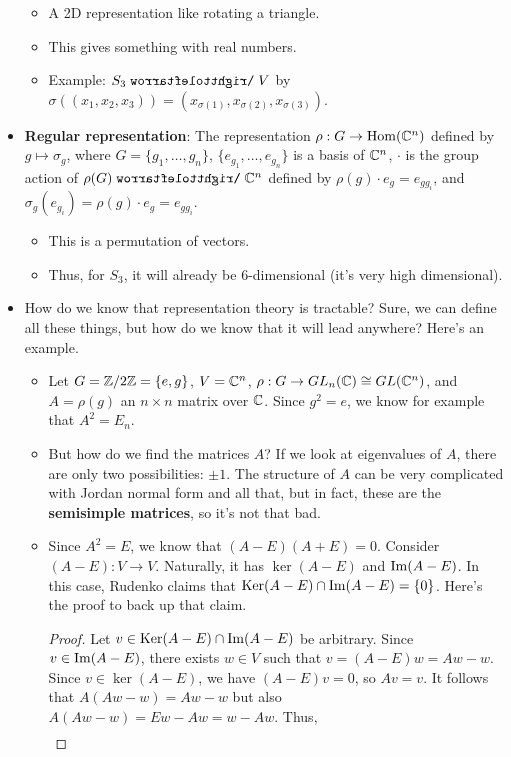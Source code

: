 \documentclass[../notes.tex]{subfiles}
\begin{document}
\begin{itemize}
\begin{itemize}
        \item A 2D representation like rotating a triangle.
        \item This gives something with real numbers.
        \item Example: $S_3\acts V$ by $\sigma((x_1,x_2,x_3))=(x_{\sigma(1)},x_{\sigma(2)},x_{\sigma(3)})$.
    \end{itemize}
    \item \textbf{Regular representation}: The representation $\rho:G\to\operatorname{Hom}(\mathbb{C}^n)$ defined by $g\mapsto\sigma_g$, where $G=\{g_1,\dots,g_n\}$, $\{e_{g_1},\dots,e_{g_n}\}$ is a basis of $\mathbb{C}^n$, $\cdot$ is the group action of $\rho(G)\acts\C^n$ defined by $\rho(g)\cdot e_g=e_{gg_i}$, and $\sigma_g(e_{g_i})=\rho(g)\cdot e_g=e_{gg_i}$.
    \begin{itemize}
        \item This is a permutation of vectors.
        \item Thus, for $S_3$, it will already be 6-dimensional (it's very high dimensional).
    \end{itemize}
    \item How do we know that representation theory is tractable? Sure, we can define all these things, but how do we know that it will lead anywhere? Here's an example.
    \begin{itemize}
        \item Let $G=\mathbb{Z}/2\mathbb{Z}=\{e,g\}$, $V=\mathbb{C}^n$, $\rho:G\to GL_n(\mathbb{C})\cong GL(\mathbb{C}^n)$, and $A=\rho(g)$ an $n\times n$ matrix over $\mathbb{C}$. Since $g^2=e$, we know for example that $A^2=E_n$.
        \item But how do we find the matrices $A$?
        If we look at eigenvalues of $A$, there are only two possibilities: $\pm 1$. The structure of $A$ can be very complicated with Jordan normal form and all that, but in fact, these are the \textbf{semisimple matrices}, so it's not that bad.
        \item Since $A^2=E$, we know that $(A-E)(A+E)=0$. Consider $(A-E):V\to V$. Naturally, it has $\ker(A-E)$ and $\operatorname{Im}(A-E)$. In this case, Rudenko claims that $\operatorname{Ker}(A-E)\cap\operatorname{Im}(A-E)=\{0\}$. Here's the proof to back up that claim.
        \begin{proof}
            Let $v\in\operatorname{Ker}(A-E)\cap\operatorname{Im}(A-E)$ be arbitrary. Since $v\in\operatorname{Im}(A-E)$, there exists $w\in V$ such that $v=(A-E)w=Aw-w$. Since $v\in\ker(A-E)$, we have $(A-E)v=0$, so $Av=v$. It follows that $A(Aw-w)=Aw-w$ but also $A(Aw-w)=Ew-Aw=w-Aw$. Thus,
            \begin{align*}

\end{align*}
\end{proof}
\end{itemize}
\end{itemize}
\end{document}
